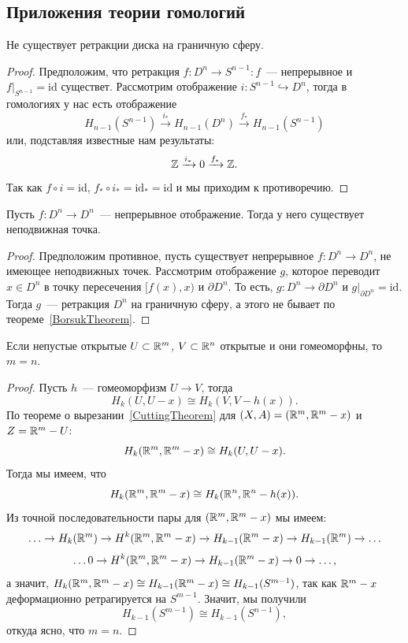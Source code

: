     \subsection{Приложения теории гомологий}

    \begin{theorem}[Борсук]\label{BorsukTheorem}
        Не существует ретракции диска на граничную сферу.
    \end{theorem}
    \begin{proof}
        Предположим, что ретракция $f\colon D^n \to S^{n - 1}\colon f$~--- непрерывное и $f\vert_{S^{n - 1}} = \mathrm{id}$ существет.
        Рассмотрим отображение $i\colon S^{n - 1} \hookrightarrow D^n$, тогда в гомологиях у нас есть отображение
        \[ H_{n - 1}(S^{n - 1}) \xrightarrow{i_{*}} H_{n - 1}(D^n) \xrightarrow{f_{*}} H_{n - 1}(S^{n - 1}) \]
        или, подставляя известные нам результаты:
        \[ \mathbb{Z} \xrightarrow{i_*} 0 \xrightarrow{f_{*}} \mathbb{Z}. \]
        Так как $f \circ i = \mathrm{id}$, $f_* \circ i_* = \mathrm{id}_* = \mathrm{id}$ и мы приходим к противоречию.
    \end{proof}
    
    \begin{theorem}
        Пусть $f\colon D^n \to D^n$~--- непрерывное отображение. 
        Тогда у него существует неподвижная точка. 
    \end{theorem}
    \begin{proof}
        Предположим противное, пусть существует непрерывное $f\colon D^n \to D^n$, не имеющее неподвижных точек. Рассмотрим отображение $g$, которое переводит $x \in D^n$
        в точку пересечения $[f(x), x)$ и $\partial D^n$. То есть, $g\colon D^n \to \partial D^n$ и $g\vert_{\partial D^n} = \mathrm{id}$.
        Тогда $g$~--- ретракция $D^n$ на граничную сферу, а этого не бывает по теореме~\ref{BorsukTheorem}.
    \end{proof}
    
    \begin{theorem}
        Если непустые открытые $U \subset \mathbb{R}^m$, $V \subset \mathbb{R}^n$ открытые и они гомеоморфны, то $m = n$.
    \end{theorem}
    \begin{proof}
        Пусть $h$~--- гомеоморфизм $U \to V$, тогда
        \[ H_{k}(U, U - x) \cong H_{k}(V, V - h(x)). \]
        По теореме о вырезании~\ref{CuttingTheorem} для $(X, A) = (\mathbb{R}^m, \mathbb{R}^m - x)$ и $Z = \mathbb{R}^m - U$:
        \[ H_{k}(\mathbb{R}^m, \mathbb{R}^m - x) \cong H_{k}(U, U - x). \]
        Тогда мы имеем, что
        \[ H_{k}(\mathbb{R}^m, \mathbb{R}^m - x) \cong H_{k}(\mathbb{R}^n, \mathbb{R}^n - h(x)). \]
        Из точной последовательности пары для $(\mathbb{R}^m, \mathbb{R}^m - x)$ мы имеем:
        \[ \ldots \to H_{k}(\mathbb{R}^m) \to H^{k}(\mathbb{R}^m, \mathbb{R}^m - x) \to H_{k - 1}(\mathbb{R}^{m} - x) \to H_{k - 1}(\mathbb{R}^m) \to \ldots \]
        \[ \ldots 0 \to H^{k}(\mathbb{R}^m, \mathbb{R}^m - x) \to H_{k - 1}(\mathbb{R}^{m} - x) \to 0 \to \ldots, \]
        а значит, $H_{k}(\mathbb{R}^m, \mathbb{R}^m - x) \cong H_{k - 1}(\mathbb{R}^m - x) \cong H_{k - 1}(S^{m - 1})$, так как
        $\mathbb{R}^{m} - x$ деформационно ретрагируется на $S^{m - 1}$. Значит, мы получили
        \[ H_{k - 1}(S^{m - 1}) \cong H_{k - 1}(S^{n - 1}), \]
        откуда ясно, что $m = n$.
    \end{proof}

